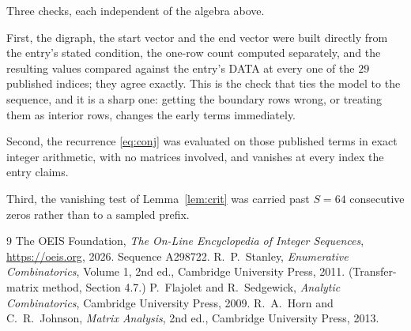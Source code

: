 \documentclass[11pt,a4paper]{article}
\theoremstyle{plain}
\theoremstyle{definition}
\begin{document}
Three checks, each independent of the algebra above.

First, the digraph, the start vector and the end vector were built directly from the
entry's stated condition, the one-row count computed separately, and the resulting values
compared against the entry's DATA at every one of the $29$ published indices; they
agree exactly. This is the check that ties the model to the sequence, and it is a sharp one:
getting the boundary rows wrong, or treating them as interior rows, changes the early terms
immediately.

Second, the recurrence \eqref{eq:conj} was evaluated on those published terms in exact
integer arithmetic, with no matrices involved, and vanishes at every index the entry claims.

Third, the vanishing test of Lemma~\ref{lem:crit} was carried past $S=64$ consecutive
zeros rather than to a sampled prefix.

\begin{thebibliography}{9}
 The OEIS Foundation, \emph{The On-Line Encyclopedia of Integer
Sequences}, \url{https://oeis.org}, 2026. Sequence A298722.
 R.~P.~Stanley, \emph{Enumerative Combinatorics}, Volume 1, 2nd ed.,
Cambridge University Press, 2011. (Transfer-matrix method, Section 4.7.)
 P.~Flajolet and R.~Sedgewick, \emph{Analytic Combinatorics}, Cambridge
University Press, 2009.
 R.~A.~Horn and C.~R.~Johnson, \emph{Matrix Analysis}, 2nd ed., Cambridge
University Press, 2013.
\end{thebibliography}
\end{document}
